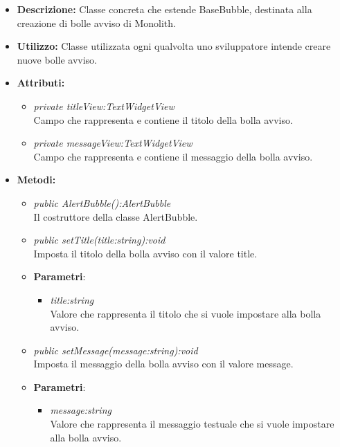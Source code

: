 \begin{itemize}
\item \textbf{Descrizione:} Classe concreta che estende BaseBubble, destinata alla creazione di bolle avviso di Monolith.
\item \textbf{Utilizzo:} Classe utilizzata ogni qualvolta uno sviluppatore intende creare nuove bolle avviso.
\item \textbf{Attributi:} 
\begin{itemize}
\item \textit{private titleView:TextWidgetView}\\
Campo che rappresenta e contiene il titolo della bolla avviso.
\item \textit{private messageView:TextWidgetView}\\
Campo che rappresenta e contiene il messaggio della bolla avviso.
\end{itemize}
\item \textbf{Metodi:}
\begin{itemize}
\item \textit{public AlertBubble():AlertBubble}\\
Il costruttore della classe AlertBubble.
\item \textit{public setTitle(title:string):void}\\
Imposta il titolo della bolla avviso con il valore title.
\item{\textbf{Parametri}: \begin{itemize}
\item \textit{title:string}\\
Valore che rappresenta il titolo che si vuole impostare alla bolla avviso.
\end{itemize}}
\item \textit{public setMessage(message:string):void}\\
Imposta il messaggio della bolla avviso con il valore message.
\item{\textbf{Parametri}: \begin{itemize}
\item \textit{message:string}\\
Valore che rappresenta il messaggio testuale che si vuole impostare alla bolla avviso.
\end{itemize}}
\end{itemize}
\end{itemize}
